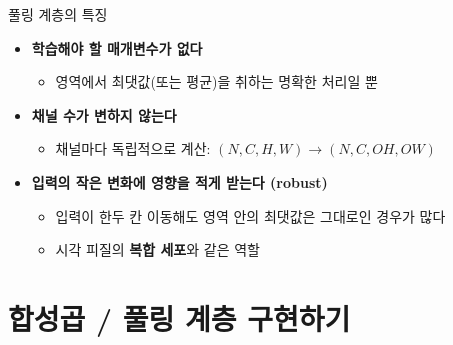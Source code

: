 \documentclass[aspectratio=169,11pt]{beamer}
\begin{document}
\begin{frame}{풀링 계층의 특징}
\begin{keybox}[풀링 계층의 특징]
\begin{itemize}
\item \textbf{학습해야 할 매개변수가 없다}
  \begin{itemize}
  \item 영역에서 최댓값(또는 평균)을 취하는 명확한 처리일 뿐
  \end{itemize}
\item \textbf{채널 수가 변하지 않는다}
  \begin{itemize}
  \item 채널마다 독립적으로 계산: $(N,C,H,W)\to(N,C,OH,OW)$
  \end{itemize}
\item \textbf{입력의 작은 변화에 영향을 적게 받는다 (robust)}
  \begin{itemize}
  \item 입력이 한두 칸 이동해도 영역 안의 최댓값은 그대로인 경우가 많다
  \item 시각 피질의 \textbf{복합 세포}와 같은 역할
  \end{itemize}
\end{itemize}
\end{keybox}
\end{frame}

\section{합성곱 / 풀링 계층 구현하기}
\end{document}
